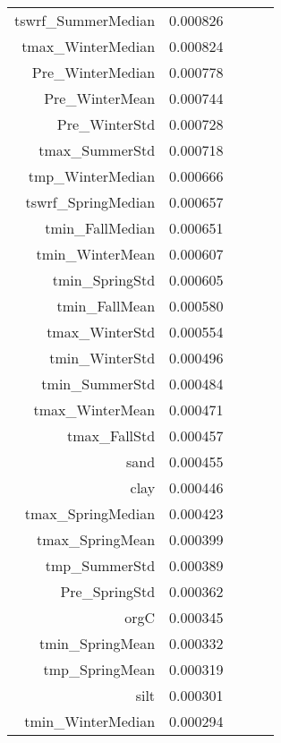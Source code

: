 \begin{tabular}{rrrrr}
tswrf_SummerMedian & 0.000826 \\
tmax_WinterMedian & 0.000824 \\
Pre_WinterMedian & 0.000778 \\
Pre_WinterMean & 0.000744 \\
Pre_WinterStd & 0.000728 \\
tmax_SummerStd & 0.000718 \\
tmp_WinterMedian & 0.000666 \\
tswrf_SpringMedian & 0.000657 \\
tmin_FallMedian & 0.000651 \\
tmin_WinterMean & 0.000607 \\
tmin_SpringStd & 0.000605 \\
tmin_FallMean & 0.000580 \\
tmax_WinterStd & 0.000554 \\
tmin_WinterStd & 0.000496 \\
tmin_SummerStd & 0.000484 \\
tmax_WinterMean & 0.000471 \\
tmax_FallStd & 0.000457 \\
sand & 0.000455 \\
clay & 0.000446 \\
tmax_SpringMedian & 0.000423 \\
tmax_SpringMean & 0.000399 \\
tmp_SummerStd & 0.000389 \\
Pre_SpringStd & 0.000362 \\
orgC & 0.000345 \\
tmin_SpringMean & 0.000332 \\
tmp_SpringMean & 0.000319 \\
silt & 0.000301 \\
tmin_WinterMedian & 0.000294 \\
\bottomrule
\end{tabular}
